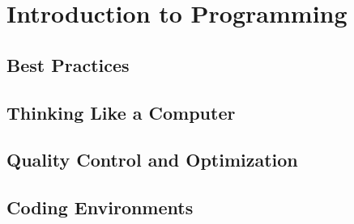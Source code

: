 \part{Introduction to Programming}

\chapter{Best Practices}




\chapter{Thinking Like a Computer}





\chapter{Quality Control and Optimization}



\chapter{Coding Environments}





